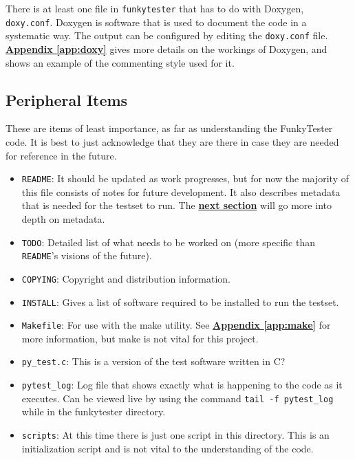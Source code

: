 \documentclass{report}
\begin{document}
There is at least one file in \texttt{funkytester} that has to do with Doxygen, \texttt{doxy.conf}. Doxygen is software that is used to document the code in a systematic way. The output can be configured by editing the \texttt{doxy.conf} file. \hyperref[app:doxy]{\textbf{Appendix \ref{app:doxy}}} gives more details on the workings of Doxygen, and  shows an example of the commenting style used for it.

\subsection{Peripheral Items}
These are items of least importance, as far as understanding the FunkyTester code. It is best to just acknowledge that they are there in case they are needed for reference in the future.
\begin{itemize}
	\item \texttt{README}: It should be updated as work progresses, but for now the majority of this file consists of notes for future development. It also describes metadata that is needed for the testset to run. The \hyperref[subsec:medium]{\textbf{next section}} will go more into depth on metadata.
	\item \texttt{TODO}: Detailed list of what needs to be worked on (more specific than \texttt{README}'s visions of the future).
	\item \texttt{COPYING}: Copyright and distribution information.
	\item \texttt{INSTALL}: Gives a list of software required to be installed to run the testset.
	\item \texttt{Makefile}: For use with the make utility. See \hyperref[app:make]{\textbf{Appendix \ref{app:make}}} for more information, but make is not vital for this project.
	\item \texttt{py\_test.c}: This is a version of the test software written in C?
	\item \texttt{pytest\_log}: Log file that shows exactly what is happening to the code as it executes. Can be viewed live by using the command \texttt{tail -f pytest\_log} while in the funkytester directory.
	\item \texttt{scripts}: At this time there is just one script in this directory. This is an initialization script and is not vital to the understanding of the code.
\end{itemize}
\end{document}
